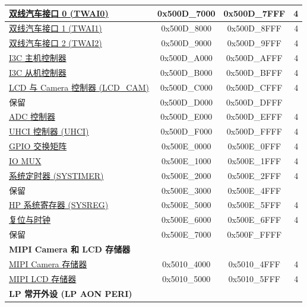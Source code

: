 \begin{ThreePartTable}
\begin{longtable}[c]{ |p{7cm}|c|c|r| }
\hyperref[mod:twai]{双线汽车接口 0 (TWAI0)}     & 0x500D\_7000 & 0x500D\_7FFF &   4 \\\hline
\hyperref[mod:twai]{双线汽车接口 1 (TWAI1)}     & 0x500D\_8000 & 0x500D\_8FFF &   4 \\\hline
\hyperref[mod:twai]{双线汽车接口 2 (TWAI2)}     & 0x500D\_9000 & 0x500D\_9FFF &   4 \\\hline
\hyperref[mod:i3c]{I3C 主机控制器}                & 0x500D\_A000 & 0x500D\_AFFF &   4 \\\hline
\hyperref[mod:i3c]{I3C 从机控制器}                    & 0x500D\_B000 & 0x500D\_BFFF &   4 \\\hline
\hyperref[mod:camlcdctrl]{LCD 与 Camera 控制器 (LCD\_CAM)}        & 0x500D\_C000 & 0x500D\_CFFF &   4 \\\hline
\rowcolor{gray!25}  保留                      & 0x500D\_D000 & 0x500D\_DFFF &     \\\hline
\hyperref[mod:adc]{ADC 控制器}                & 0x500D\_E000 & 0x500D\_EFFF &   4 \\\hline
\hyperref[mod:uart]{UHCI 控制器 (UHCI)}       & 0x500D\_F000 & 0x500D\_FFFF &   4 \\\hline
\hyperref[mod:iomuxgpio]{GPIO 交换矩阵}             & 0x500E\_0000 & 0x500E\_0FFF &   4 \\\hline
\hyperref[mod:iomuxgpio]{IO MUX}                  & 0x500E\_1000 & 0x500E\_1FFF &   4 \\\hline
\hyperref[mod:systimer]{系统定时器 (SYSTIMER)}  & 0x500E\_2000 & 0x500E\_2FFF &   4 \\\hline
\rowcolor{gray!25}  保留                      & 0x500E\_3000 & 0x500E\_4FFF &    \\\hline
\hyperref[mod:sysreg]{HP 系统寄存器 (SYSREG)}               & 0x500E\_5000 & 0x500E\_5FFF &   4 \\\hline
\hyperref[mod:resclk]{复位与时钟}            & 0x500E\_6000 & 0x500E\_6FFF &   4 \\\hline
\rowcolor{gray!25}  保留                      & 0x500E\_7000 & 0x500F\_FFFF &    \\\hline
\multicolumn{4}{|l|}{\textbf{MIPI Camera 和 LCD 存储器}} \\ \hline
\hyperref[mod:mipicsi]{MIPI Camera 存储器}        & 0x5010\_4000 & 0x5010\_4FFF &   4 \\\hline
\hyperref[mod:mipidsi]{MIPI LCD 存储器}           & 0x5010\_5000 & 0x5010\_5FFF &   4 \\\hline
\multicolumn{4}{|l|}{\textbf{LP 常开外设 (LP AON PERI)}} \\ \hline

\end{longtable}
\end{ThreePartTable}
